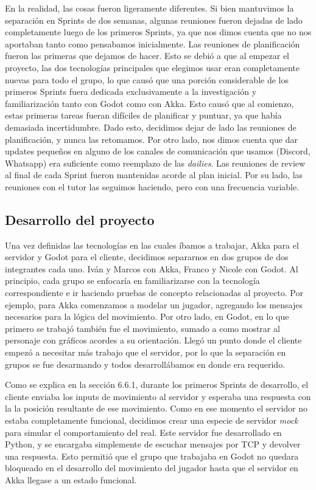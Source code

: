 En la realidad, las cosas fueron ligeramente diferentes. Si bien mantuvimos la separación en Sprints de dos semanas, algunas reuniones
fueron dejadas de lado completamente luego de los primeros Sprints, ya que nos dimos cuenta que no nos aportaban tanto como pensabamos
inicialmente.
Las reuniones de planificación fueron las primeras que dejamos de hacer. Esto se debió a que al empezar el proyecto, las 
dos tecnologías principales que elegimos usar eran completamente nuevas para todo el grupo, lo que causó que una porción considerable de
los primeros Sprints fuera dedicada exclusivamente a la investigación y familiarización tanto con Godot como con Akka. Esto causó que al
comienzo, estas primeras tareas fueran difíciles de planificar y puntuar, ya que había demasiada incertidumbre. Dado esto, decidimos dejar
de lado las reuniones de planificación, y nunca las retomamos.
Por otro lado, nos dimos cuenta que dar updates pequeños en alguno de los canales de comunicación que usamos (Discord, Whatsapp) era suficiente
como reemplazo de las \textit{dailies}.
Las reuniones de review al final de cada Sprint fueron mantenidas acorde al plan inicial.
Por su lado, las reuniones con el tutor las seguimos haciendo, pero con una frecuencia variable.

\subsection{Desarrollo del proyecto}
Una vez definidas las tecnologías en las cuales íbamos a trabajar, Akka para el servidor y Godot para el cliente, decidimos separarnos
en dos grupos de dos integrantes cada uno. Iván y Marcos con Akka, Franco y Nicole con Godot. Al principio, cada grupo se enfocaría en 
familiarizarse con la tecnología correspondiente e ir haciendo pruebas de concepto relacionadas al proyecto. Por ejemplo, para Akka 
comenzamos a modelar un jugador, agregando los mensajes necesarios para la lógica del movimiento. Por otro lado, en Godot, en lo que primero
se trabajó también fue el movimiento, sumado a como mostrar al personaje con gráficos acordes a su orientación.
Llegó un punto donde el cliente empezó a necesitar más trabajo que el servidor, por lo que la separación en grupos se fue desarmando y
todos desarrollábamos en donde era requerido.

Como se explica en la sección 6.6.1, durante los primeros Sprints de desarrollo, el cliente enviaba los inputs de movimiento al servidor y esperaba una respuesta con la
la posición resultante de ese movimiento. Como en ese momento el servidor no estaba completamente funcional, decidimos crear una especie de servidor
\textit{mock} para simular el comportamiento del real. Este servidor fue desarrollado en Python, y se encargaba simplemente de escuchar mensajes por TCP
y devolver una respuesta. Esto permitió que el grupo que trabajaba en Godot no quedara bloqueado en el desarrollo del movimiento del jugador
hasta que el servidor en Akka llegase a un estado funcional.

